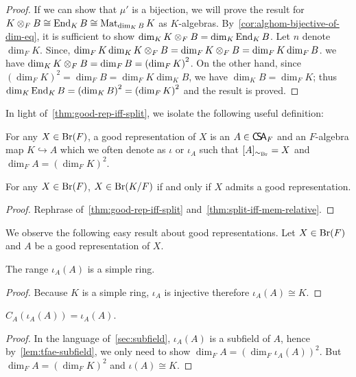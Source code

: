 \begin{proof}
   If we can show that $\mu'$ is a bijection, we will prove the result for $K\otimes_{F} B \cong \operatorname{End}_{K} B \cong \operatorname{Mat}_{\dim_{K} B}K$ as $K$-algebras. By~\cref{cor:alghom-bijective-of-dim-eq}, it is sufficient to show $\dim_{K}K\otimes_{F}B = \dim_{K}\operatorname{End}_{K}B$. Let $n$ denote $\dim_{F}K$. Since, $\dim_{F}K\dim_{K}K\otimes_{F}B =\dim_{F}K\otimes_{F}B=\dim_{F}K \dim_{F}B$. we have $\dim_{K}K\otimes_{F}B = \dim_{F}B = {\left(\dim_{F}K\right)}^{2}$. On the other hand, since ${\left(\dim_{F}K\right)}^{2}=\dim_{F} B = \dim_{F}K\dim_{K}B$, we have $\dim_{K} B = \dim_{F}K$; thus $\dim_{K}\operatorname{End}_{K} B = {\left(\dim_{K}B\right)}^{2}={\left(\dim_{F}K\right)}^{2}$ and the result is proved.
 \end{proof}

 In light of~\cref{thm:good-rep-iff-split}, we isolate the following useful definition:
 \begin{definition}\label{def:good-rep}
   For any $X \in \operatorname{Br}(F)$, a good representation of $X$ is an $A \in \operatorname{\mathsf{C}\!\mathsf{S}\!\mathsf{A}}_{F}$ and an $F$-algebra map $K \hookrightarrow A$ which we often denote as $\iota$ or $\iota_{A}$ such that $[A]_{\sim_{\operatorname{Br}}} = X$ and $\dim_{F}A={\left(\dim_{F}K\right)}^{2}$.
   \leanok
 \end{definition}

 \begin{corollary}
   \label{cor:mem-relative-br-iff-good-rep}
   For any $X\in\operatorname{Br}(F)$, $X\in\operatorname{Br}(K/F)$ if and only if $X$ admits a good representation.
   \leanok
 \end{corollary}
 \begin{proof}
   Rephrase of~\cref{thm:good-rep-iff-split} and~\cref{thm:split-iff-mem-relative}.
 \end{proof}

We observe the following easy result about good representations. Let $X \in \operatorname{Br}(F)$ and $A$ be a good representation of $X$.

\begin{lemma}
  The range $\iota_{A}(A)$ is a simple ring.
  \leanok
\end{lemma}

\begin{proof}
  Because $K$ is a simple ring, $\iota_{A}$ is injective therefore $\iota_{A}(A)\cong K$.
\end{proof}

\begin{lemma}\label{lem:centralizer-range-good-rep}
  $C_{A}\left(\iota_{A}(A)\right) = \iota_{A}(A)$.
  \leanok
\end{lemma}
\begin{proof}
  In the language of~\cref{sec:subfield}, $\iota_{A}(A)$ is a subfield of $A$, hence by~\cref{lem:tfae-subfield}, we only need to show $\dim_{F}A = {\left(\dim_{F}\iota_{A}(A)\right)}^{2}$. But $\dim_{F}A={\left(\dim_{F}K\right)}^{2}$ and $\iota(A)\cong K$.
\end{proof}

